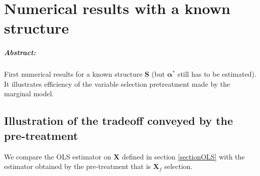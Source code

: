 \documentclass[12pt,a4paper]{report}
\begin{document}
			
			
			
			
\chapter{Numerical results with a known structure}	\label{chaptersimulexpl}
\paragraph{Abstract:} First numerical results for a known structure $\boldsymbol{S}$ (but $\boldsymbol{\alpha}^* $ still has to be estimated). It illustrates efficiency of the variable selection pretreatment made by the marginal model.
		 
	\section{Illustration of the tradeoff conveyed by the pre-treatment}	
	We compare the OLS estimator on $\boldsymbol{X}$ defined in section \ref{sectionOLS} with the estimator obtained by the pre-treatment that is $\boldsymbol{X}_f$ selection.
  
\end{document}
